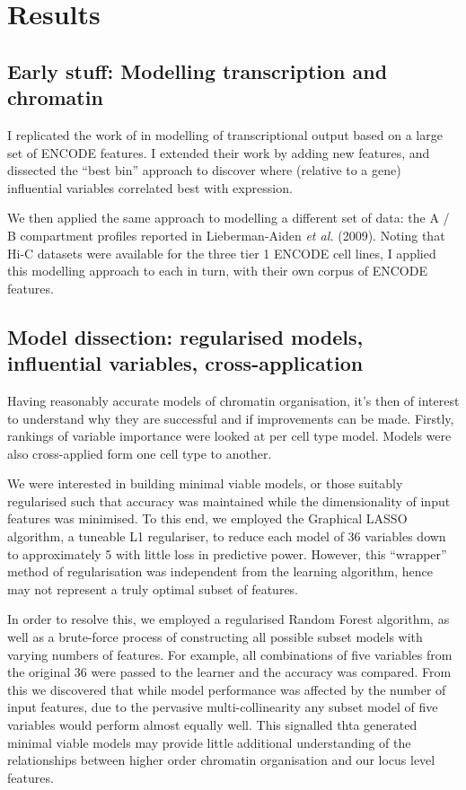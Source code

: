 \documentclass[a4paper,10pt,oneside]{book}
\begin{document}
\section{Results}\label{results}

\subsection{\textbf{Early stuff:} Modelling transcription and
chromatin}\label{early-stuff-modelling-transcription-and-chromatin}

I replicated the work of \citealt{Dong2012} in modelling of
transcriptional output based on a large set of ENCODE features. I
extended their work by adding new features, and dissected the ``best
bin'' approach to discover where (relative to a gene) influential
variables correlated best with expression.

We then applied the same approach to modelling a different set of data:
the A / B compartment profiles reported in Lieberman-Aiden \emph{et al.}
(2009). Noting that Hi-C datasets were available for the three tier 1
ENCODE cell lines, I applied this modelling approach to each in turn,
with their own corpus of ENCODE features.

\subsection{\textbf{Model dissection}: regularised models, influential
variables,
cross-application}\label{model-dissection-regularised-models-influential-variables-cross-application}

Having reasonably accurate models of chromatin organisation, it's then
of interest to understand why they are successful and if improvements
can be made. Firstly, rankings of variable importance were looked at per
cell type model. Models were also cross-applied form one cell type to
another.

We were interested in building minimal viable models, or those suitably
regularised such that accuracy was maintained while the dimensionality
of input features was minimised. To this end, we employed the Graphical
LASSO algorithm, a tuneable L1 regulariser, to reduce each model of 36
variables down to approximately 5 with little loss in predictive power.
However, this ``wrapper'' method of regularisation was independent from
the learning algorithm, hence may not represent a truly optimal subset
of features.

In order to resolve this, we employed a regularised Random Forest
algorithm, as well as a brute-force process of constructing all possible
subset models with varying numbers of features. For example, all
combinations of five variables from the original 36 were passed to the
learner and the accuracy was compared. From this we discovered that
while model performance was affected by the number of input features,
due to the pervasive multi-collinearity any subset model of five
variables would perform almost equally well. This signalled thta
generated minimal viable models may provide little additional
understanding of the relationships between higher order chromatin
organisation and our locus level features.
\end{document}
